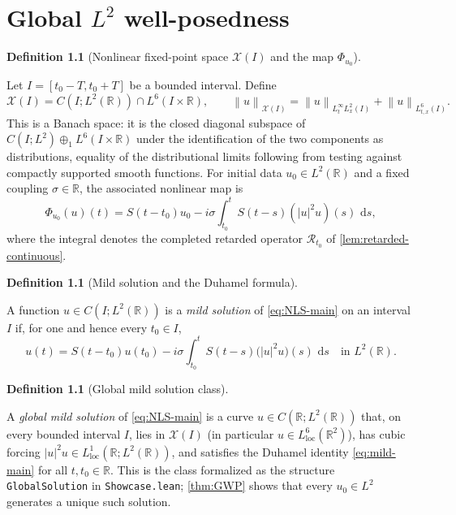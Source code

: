 \documentclass[11pt,oneside]{book}
\providecommand{\uses}[1]{}
\theoremstyle{definition}
\newtheorem{definition}[theorem]{Definition}
\theoremstyle{remark}
\newcommand{\R}{\mathbb R}
\newcommand{\1}{\mathbf 1}
\newcommand{\loc}{\mathrm{loc}}
\newcommand{\dd}{\,\mathrm d}
\newcommand{\norm}[1]{\left\lVert #1\right\rVert}
\newcommand{\abs}[1]{\left\lvert #1\right\rvert}
\begin{document}
\chapter{Global $L^2$ well-posedness}\label{chap:wellposed}

\begin{definition}[Nonlinear fixed-point space $\mathcal X(I)$ and the map $\Phi_{u_0}$]
\label{def:fixed-point-space}
\uses{def:scalar-mixed-norm}
Let $I=[t_0-T,t_0+T]$ be a bounded interval. Define
\[
  \mathcal X(I)=C(I;L^2(\R))\cap L^6(I\times\R),
  \qquad
  \norm u_{\mathcal X(I)}
  =\norm u_{L^\infty_tL^2_x(I)}+\norm u_{L^6_{t,x}(I)}.
\]
This is a Banach space: it is the closed diagonal subspace of
$C(I;L^2)\oplus_1L^6(I\times\R)$ under the identification of the two
components as distributions, equality of the distributional limits following
from testing against compactly supported smooth functions.
For initial data $u_0\in L^2(\R)$ and a fixed coupling $\sigma\in\R$, the
associated nonlinear map is
\begin{equation}
 \Phi_{u_0}(u)(t)
 =S(t-t_0)u_0-i\sigma\int_{t_0}^tS(t-s)(|u|^2u)(s)\,\dd s,  \label{eq:Phi}
\end{equation}
where the integral denotes the completed retarded operator
$\mathcal R_{t_0}$ of \cref{lem:retarded-continuous}.
\end{definition}

\begin{definition}[Mild solution and the Duhamel formula]\label{def:mild-solution}
\uses{def:cubic-nls, def:propagator}
A function $u\in C(I;L^2(\R))$ is a \emph{mild solution} of \eqref{eq:NLS-main} on an interval
$I$ if, for one and hence every $t_0\in I$,
\begin{equation}
 u(t)=S(t-t_0)u(t_0)-i\sigma\int_{t_0}^t S(t-s)\bigl(\abs{u}^2u\bigr)(s)\,\dd s
 \quad\text{in }L^2(\R).
 \label{eq:mild-main}
\end{equation}
\end{definition}

\begin{definition}[Global mild solution class]\label{def:global-mild-solution}
\uses{def:mild-solution, def:fixed-point-space, def:scalar-mixed-norm, lem:joint-representative-L2}
A \emph{global mild solution} of \eqref{eq:NLS-main} is a curve $u\in C(\R;L^2(\R))$ that, on
every bounded interval $I$, lies in $\mathcal X(I)$ (in particular $u\in L^6_{\loc}(\R^2)$), has
cubic forcing $\abs{u}^2u\in L^1_{\loc}(\R;L^2(\R))$, and satisfies the Duhamel identity
\eqref{eq:mild-main} for all $t,t_0\in\R$. This is the class formalized as the structure
\texttt{GlobalSolution} in \texttt{Showcase.lean}; \cref{thm:GWP} shows that every $u_0\in L^2$
generates a unique such solution.
\end{definition}
\end{document}
